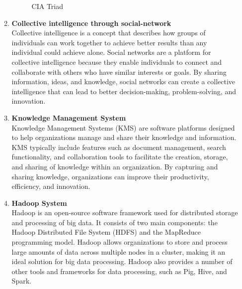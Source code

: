\documentclass[12pt]{article}
\begin{document}
\begin{enumerate}
\begin{enumerate}
\begin{figure}[h!]
        \caption{CIA Triad}
    \end{figure}
    \item {\bfseries Collective intelligence through social-network\\}
    Collective intelligence is a concept that describes how groups of individuals can work together to achieve better results than any individual could achieve alone. Social networks are a platform for collective intelligence because they enable individuals to connect and collaborate with others who have similar interests or goals. By sharing information, ideas, and knowledge, social networks can create a collective intelligence that can lead to better decision-making, problem-solving, and innovation.
    \item {\bfseries Knowledge Management System\\}
    Knowledge Management Systems (KMS) are software platforms designed to help organizations manage and share their knowledge and information. KMS typically include features such as document management, search functionality, and collaboration tools to facilitate the creation, storage, and sharing of knowledge within an organization. By capturing and sharing knowledge, organizations can improve their productivity, efficiency, and innovation.
    \item {\bfseries Hadoop System \\}
    Hadoop is an open-source software framework used for distributed storage and processing of big data. It consists of two main components: the Hadoop Distributed File System (HDFS) and the MapReduce programming model. Hadoop allows organizations to store and process large amounts of data across multiple nodes in a cluster, making it an ideal solution for big data processing. Hadoop also provides a number of other tools and frameworks for data processing, such as Pig, Hive, and Spark.
    \end{enumerate}
    \end{enumerate}
    
\end{document}
